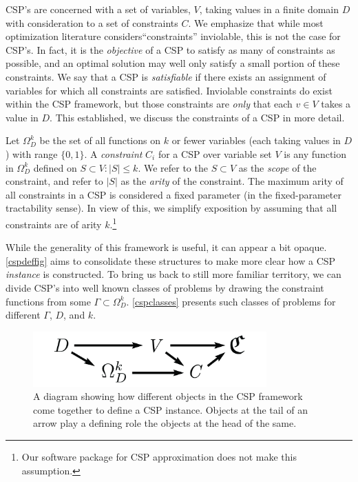 \documentclass[12pt]{article} %
\begin{document}
CSP's are concerned with a set of variables, $V$, taking values in a finite domain $D$ with consideration to a set of constraints $C$. We emphasize that while most optimization literature considers``constraints'' inviolable, this is not the case for CSP's. In fact, it is the \textit{objective} of a CSP to satisfy as many of constraints as possible, and an optimal solution may well only satisfy a small portion of these constraints. We say that a CSP is \textit{satisfiable} if there exists an assignment of variables for which all constraints are satisfied. Inviolable constraints do exist within the CSP framework, but those constraints are \textit{only} that each $v \in V$ takes a value in $D$. This established, we discuss the constraints of a CSP in more detail. 

Let $\Omega_D^k$ be the set of all functions on $k$ or fewer variables (each taking values in $D$) with range $\{ 0,1 \}$. A \textit{constraint} $C_i$ for a CSP over variable set $V$ is any function in $\Omega_D^k$ defined on $S \subset V : |S| \leq k$. We refer to the $S \subset V$ as the \textit{scope} of the constraint, and refer to $|S|$ as the \textit{arity} of the constraint. The maximum arity of all constraints in a CSP is considered a fixed parameter (in the fixed-parameter tractability sense). In view of this, we simplify exposition by assuming that all constraints are of arity $k$.\footnote{Our software package for CSP approximation does not make this assumption.}

While the generality of this framework is useful, it can appear a bit opaque. \autoref{cspdeffig} aims to consolidate these structures to make more clear how a CSP \textit{instance} is constructed. To bring us back to still more familiar territory, we can divide CSP's into well known classes of problems by drawing the constraint functions from some $\Gamma \subset \Omega_D^k$. \autoref{cspclasses} presents such classes of problems for different $\Gamma$, $D$, and $k$.


\begin{figure}
\begin{center}
\includegraphics[width=0.8\textwidth]{images/cspdefsec_thinner}
\caption{A diagram showing how different objects in the CSP framework come together to define a CSP instance. Objects at the tail of an arrow play a defining role the objects at the head of the same.}
\label{cspdeffig}
\end{center}
\end{figure}
\end{document}
